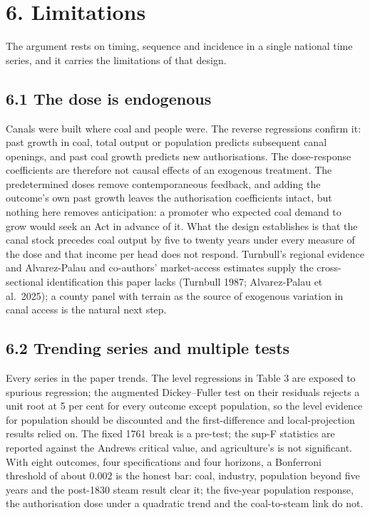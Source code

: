 \documentclass[
  11pt,
]{article}
\begin{document}
\section{6. Limitations}\label{limitations}

The argument rests on timing, sequence and incidence in a single
national time series, and it carries the limitations of that design.

\subsection{6.1 The dose is endogenous}\label{the-dose-is-endogenous}

Canals were built where coal and people were. The reverse regressions
confirm it: past growth in coal, total output or population predicts
subsequent canal openings, and past coal growth predicts new
authorisations. The dose-response coefficients are therefore not causal
effects of an exogenous treatment. The predetermined doses remove
contemporaneous feedback, and adding the outcome's own past growth
leaves the authorisation coefficients intact, but nothing here removes
anticipation: a promoter who expected coal demand to grow would seek an
Act in advance of it. What the design establishes is that the canal
stock precedes coal output by five to twenty years under every measure
of the dose and that income per head does not respond. Turnbull's
regional evidence and Alvarez-Palau and co-authors' market-access
estimates supply the cross-sectional identification this paper lacks
(Turnbull 1987; Alvarez-Palau et al.~2025); a county panel with terrain
as the source of exogenous variation in canal access is the natural next
step.

\subsection{6.2 Trending series and multiple
tests}\label{trending-series-and-multiple-tests}

Every series in the paper trends. The level regressions in Table 3 are
exposed to spurious regression; the augmented Dickey--Fuller test on
their residuals rejects a unit root at 5 per cent for every outcome
except population, so the level evidence for population should be
discounted and the first-difference and local-projection results relied
on. The fixed 1761 break is a pre-test; the sup-F statistics are
reported against the Andrews critical value, and agriculture's is not
significant. With eight outcomes, four specifications and four horizons,
a Bonferroni threshold of about 0.002 is the honest bar: coal, industry,
population beyond five years and the post-1830 steam result clear it;
the five-year population response, the authorisation dose under a
quadratic trend and the coal-to-steam link do not.
\end{document}
